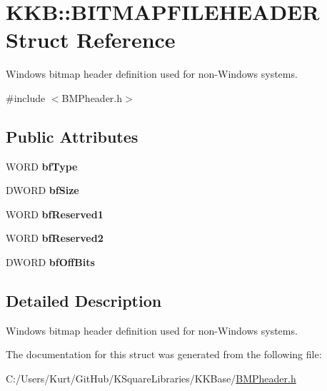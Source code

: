 \hypertarget{struct_k_k_b_1_1_b_i_t_m_a_p_f_i_l_e_h_e_a_d_e_r}{}\section{K\+KB\+:\+:B\+I\+T\+M\+A\+P\+F\+I\+L\+E\+H\+E\+A\+D\+ER Struct Reference}
\label{struct_k_k_b_1_1_b_i_t_m_a_p_f_i_l_e_h_e_a_d_e_r}


Windows bitmap header definition used for non-\/\+Windows systems.  




{\ttfamily \#include $<$B\+M\+Pheader.\+h$>$}

\subsection*{Public Attributes}
\begin{DoxyCompactItemize}
\item 
W\+O\+RD {\bfseries bf\+Type}\hypertarget{struct_k_k_b_1_1_b_i_t_m_a_p_f_i_l_e_h_e_a_d_e_r_a3b1bc85621ddeabbc7fdee9d6bf8de09}{}\label{struct_k_k_b_1_1_b_i_t_m_a_p_f_i_l_e_h_e_a_d_e_r_a3b1bc85621ddeabbc7fdee9d6bf8de09}

\item 
D\+W\+O\+RD {\bfseries bf\+Size}\hypertarget{struct_k_k_b_1_1_b_i_t_m_a_p_f_i_l_e_h_e_a_d_e_r_a8f856e9dc340d0958db0399c64e17749}{}\label{struct_k_k_b_1_1_b_i_t_m_a_p_f_i_l_e_h_e_a_d_e_r_a8f856e9dc340d0958db0399c64e17749}

\item 
W\+O\+RD {\bfseries bf\+Reserved1}\hypertarget{struct_k_k_b_1_1_b_i_t_m_a_p_f_i_l_e_h_e_a_d_e_r_aa5be42c4a8c2413070786fb320671048}{}\label{struct_k_k_b_1_1_b_i_t_m_a_p_f_i_l_e_h_e_a_d_e_r_aa5be42c4a8c2413070786fb320671048}

\item 
W\+O\+RD {\bfseries bf\+Reserved2}\hypertarget{struct_k_k_b_1_1_b_i_t_m_a_p_f_i_l_e_h_e_a_d_e_r_a6683de5bf5a5fee797ba10d104e893d7}{}\label{struct_k_k_b_1_1_b_i_t_m_a_p_f_i_l_e_h_e_a_d_e_r_a6683de5bf5a5fee797ba10d104e893d7}

\item 
D\+W\+O\+RD {\bfseries bf\+Off\+Bits}\hypertarget{struct_k_k_b_1_1_b_i_t_m_a_p_f_i_l_e_h_e_a_d_e_r_a294a1420f7481463b248d889f67ed234}{}\label{struct_k_k_b_1_1_b_i_t_m_a_p_f_i_l_e_h_e_a_d_e_r_a294a1420f7481463b248d889f67ed234}

\end{DoxyCompactItemize}


\subsection{Detailed Description}
Windows bitmap header definition used for non-\/\+Windows systems. 

The documentation for this struct was generated from the following file\+:\begin{DoxyCompactItemize}
\item 
C\+:/\+Users/\+Kurt/\+Git\+Hub/\+K\+Square\+Libraries/\+K\+K\+Base/\hyperlink{_b_m_pheader_8h}{B\+M\+Pheader.\+h}\end{DoxyCompactItemize}
